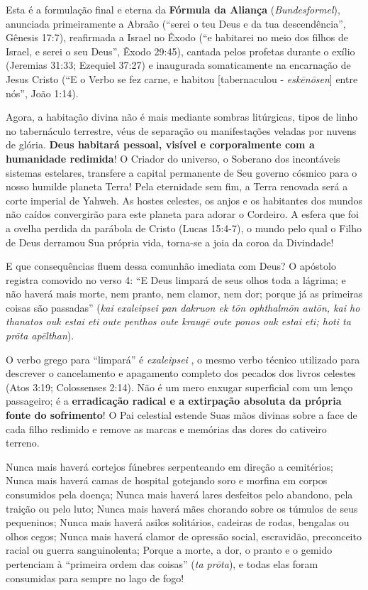 \documentclass[11pt,a4paper,openany]{book}
\begin{document}
Esta é a formulação final e eterna da \textbf{Fórmula da Aliança} (\textit{Bundesformel}), anunciada primeiramente a Abraão (``serei o teu Deus e da tua descendência'', Gênesis 17:7), reafirmada a Israel no Êxodo (``e habitarei no meio dos filhos de Israel, e serei o seu Deus'', Êxodo 29:45), cantada pelos profetas durante o exílio (Jeremias 31:33; Ezequiel 37:27) e inaugurada somaticamente na encarnação de Jesus Cristo (``E o Verbo se fez carne, e habitou [tabernaculou - \textit{eskēnōsen}] entre nós'', João 1:14).

Agora, a habitação divina não é mais mediante sombras litúrgicas, tipos de linho no tabernáculo terrestre, véus de separação ou manifestações veladas por nuvens de glória. \textbf{Deus habitará pessoal, visível e corporalmente com a humanidade redimida}!
O Criador do universo, o Soberano dos incontáveis sistemas estelares, transfere a capital permanente de Seu governo cósmico para o nosso humilde planeta Terra! Pela eternidade sem fim, a Terra renovada será a corte imperial de Yahweh. As hostes celestes, os anjos e os habitantes dos mundos não caídos convergirão para este planeta para adorar o Cordeiro. A esfera que foi a ovelha perdida da parábola de Cristo (Lucas 15:4-7), o mundo pelo qual o Filho de Deus derramou Sua própria vida, torna-se a joia da coroa da Divindade!

E que consequências fluem dessa comunhão imediata com Deus?
O apóstolo registra comovido no verso 4:
``E Deus limpará de seus olhos toda a lágrima; e não haverá mais morte, nem pranto, nem clamor, nem dor; porque já as primeiras coisas são passadas'' (\textit{kai exaleipsei pan dakruon ek tōn ophthalmōn autōn, kai ho thanatos ouk estai eti oute penthos oute kraugē oute ponos ouk estai eti; hoti ta prōta apēlthan}).

O verbo grego para ``limpará'' é \textit{exaleipsei} , o mesmo verbo técnico utilizado para descrever o cancelamento e apagamento completo dos pecados dos livros celestes (Atos 3:19; Colossenses 2:14). Não é um mero enxugar superficial com um lenço passageiro; é a \textbf{erradicação radical e a extirpação absoluta da própria fonte do sofrimento}!
O Pai celestial estende Suas mãos divinas sobre a face de cada filho redimido e remove as marcas e memórias das dores do cativeiro terreno.

Nunca mais haverá cortejos fúnebres serpenteando em direção a cemitérios;
Nunca mais haverá camas de hospital gotejando soro e morfina em corpos consumidos pela doença;
Nunca mais haverá lares desfeitos pelo abandono, pela traição ou pelo luto;
Nunca mais haverá mães chorando sobre os túmulos de seus pequeninos;
Nunca mais haverá asilos solitários, cadeiras de rodas, bengalas ou olhos cegos;
Nunca mais haverá clamor de opressão social, escravidão, preconceito racial ou guerra sanguinolenta;
Porque a morte, a dor, o pranto e o gemido pertenciam à ``primeira ordem das coisas'' (\textit{ta prōta}), e todas elas foram consumidas para sempre no lago de fogo!
\end{document}
